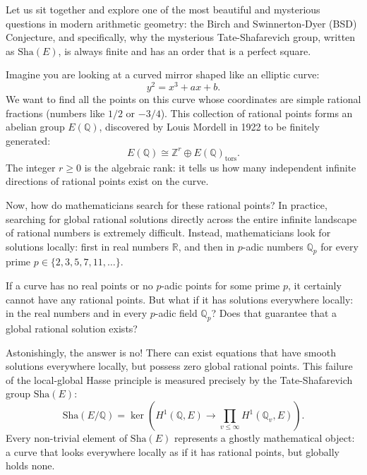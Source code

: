 \documentclass[11pt,a4paper]{article}
\providecommand{\Sha}{\mathrm{Sha}}
\theoremstyle{definition}
\begin{document}
Let us sit together and explore one of the most beautiful and mysterious questions in modern arithmetic geometry: the Birch and Swinnerton-Dyer (BSD) Conjecture, and specifically, why the mysterious Tate-Shafarevich group, written as $\Sha(E)$, is always finite and has an order that is a perfect square.

Imagine you are looking at a curved mirror shaped like an elliptic curve:
\begin{equation}
y^2 = x^3 + a x + b.
\end{equation}
We want to find all the points on this curve whose coordinates are simple rational fractions (numbers like $1/2$ or $-3/4$). This collection of rational points forms an abelian group $E(\mathbb{Q})$, discovered by Louis Mordell in 1922 to be finitely generated:
\begin{equation}
E(\mathbb{Q}) \cong \mathbb{Z}^r \oplus E(\mathbb{Q})_{\mathrm{tors}}.
\end{equation}
The integer $r \ge 0$ is the algebraic rank: it tells us how many independent infinite directions of rational points exist on the curve.

Now, how do mathematicians search for these rational points? In practice, searching for global rational solutions directly across the entire infinite landscape of rational numbers is extremely difficult. Instead, mathematicians look for solutions locally: first in real numbers $\mathbb{R}$, and then in $p$-adic numbers $\mathbb{Q}_p$ for every prime $p \in \{2, 3, 5, 7, 11, \dots\}$.

If a curve has no real points or no $p$-adic points for some prime $p$, it certainly cannot have any rational points. But what if it has solutions everywhere locally: in the real numbers and in every $p$-adic field $\mathbb{Q}_p$? Does that guarantee that a global rational solution exists?

Astonishingly, the answer is no! There can exist equations that have smooth solutions everywhere locally, but possess zero global rational points. This failure of the local-global Hasse principle is measured precisely by the Tate-Shafarevich group $\Sha(E)$:
\begin{equation}
\Sha(E/\mathbb{Q}) = \ker\left( H^1(\mathbb{Q}, E) \to \prod_{v \le \infty} H^1(\mathbb{Q}_v, E) \right).
\end{equation}
Every non-trivial element of $\Sha(E)$ represents a ghostly mathematical object: a curve that looks everywhere locally as if it has rational points, but globally holds none.
\end{document}

